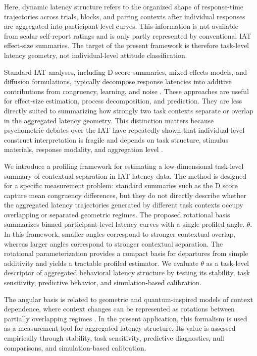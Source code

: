 \documentclass[12pt]{article}
\begin{document}
Here, dynamic latency structure refers to the organized shape of response-time trajectories across trials, blocks, and pairing contexts after individual responses are aggregated into participant-level curves. This information is not available from scalar self-report ratings and is only partly represented by conventional IAT effect-size summaries. The target of the present framework is therefore task-level latency geometry, not individual-level attitude classification.

Standard IAT analyses, including D-score summaries, mixed-effects models, and diffusion formulations, typically decompose response latencies into additive contributions from congruency, learning, and noise \citep{klauer2007process,ratcliff2016diffusion}. These approaches are useful for effect-size estimation, process decomposition, and prediction. They are less directly suited to summarizing how strongly two task contexts separate or overlap in the aggregated latency geometry. This distinction matters because psychometric debates over the IAT have repeatedly shown that individual-level construct interpretation is fragile and depends on task structure, stimulus materials, response modality, and aggregation level \citep{schimmack2019iat,kurdi2020iat_response,hogenboom2024stimuli,baranan2024facial,axt2024predictive}.

We introduce a profiling framework for estimating a low-dimensional task-level summary of contextual separation in IAT latency data. The method is designed for a specific measurement problem: standard summaries such as the D score capture mean congruency differences, but they do not directly describe whether the aggregated latency trajectories generated by different task contexts occupy overlapping or separated geometric regimes. The proposed rotational basis summarizes binned participant-level latency curves with a single profiled angle, \(\theta\). In this framework, smaller angles correspond to stronger contextual overlap, whereas larger angles correspond to stronger contextual separation. The rotational parameterization provides a compact basis for departures from simple additivity and yields a tractable profiled estimator. We evaluate \(\theta\) as a task-level descriptor of aggregated behavioral latency structure by testing its stability, task sensitivity, predictive behavior, and simulation-based calibration.

The angular basis is related to geometric and quantum-inspired models of context dependence, where context changes can be represented as rotations between partially overlapping regimes \citep{busemeyer2012,pothos2013,pothos2022quantum,trueblood2011}. In the present application, this formalism is used as a measurement tool for aggregated latency structure. Its value is assessed empirically through stability, task sensitivity, predictive diagnostics, null comparisons, and simulation-based calibration.
\end{document}
